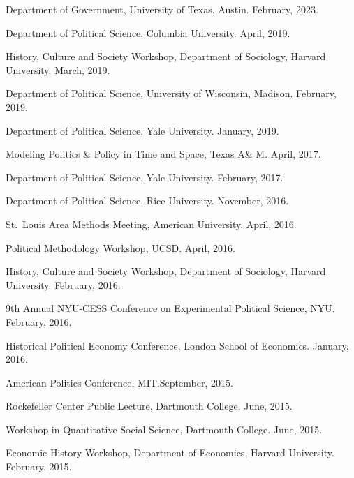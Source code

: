 \documentclass[11pt,article,oneside]{memoir}
\begin{document}
\begin{cvlist}[itemsep = 0em, parsep = 0em]
  \item  Department of Government, University of Texas, Austin. February, 2023.
  \item  Department of Political Science,  Columbia University. April, 2019.
  \item History, Culture and Society Workshop, Department of Sociology, Harvard University. March, 2019. 
  \item  Department of Political Science,  University of Wisconsin, Madison. February, 2019. 
  \item  Department of Political Science, Yale University. January, 2019. 

  \item  Modeling Politics \& Policy in Time and Space, Texas A\& M. April, 2017. 

  \item  Department of Political Science, Yale University. February, 2017. 

  \item  Department of Political Science, Rice University. November, 2016. 

  \item  St.\ Louis Area Methods Meeting, American University. April, 2016. 

  \item  Political Methodology Workshop, UCSD. April, 2016. 
  \item History, Culture and Society Workshop, Department of Sociology, Harvard University. February, 2016.
  \item  9th Annual NYU-CESS Conference on Experimental Political Science, NYU. February, 2016. 

  \item  Historical Political Economy Conference, London School of Economics. January, 2016. 

  \item  American Politics Conference, MIT.\@ September, 2015. 

  \item  Rockefeller Center Public Lecture, Dartmouth College. June, 2015.

  \item  Workshop in Quantitative Social Science, Dartmouth College. June, 2015.

  \item  Economic History Workshop, Department of Economics, Harvard University. February, 2015.


\end{cvlist}
\end{document}
